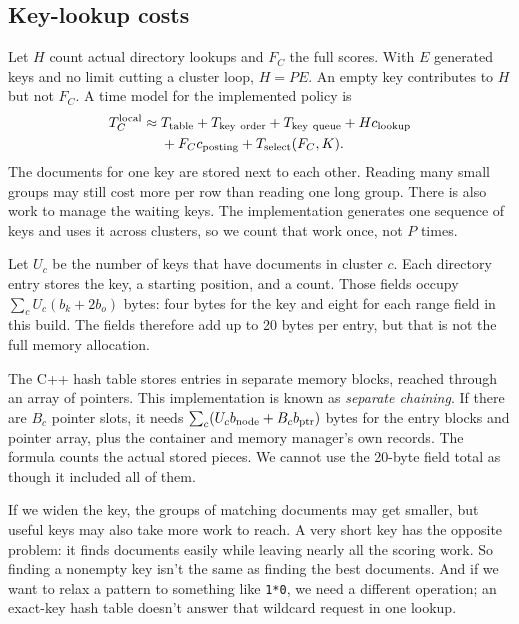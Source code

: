 \subsection{Key-lookup costs}
Let $H$ count actual directory lookups and $F_C$ the full scores. With $E$ generated keys and
no limit cutting a cluster loop, $H=PE$. An empty key contributes to $H$ but not $F_C$. A time
model for the implemented policy is
\begin{equation}
\begin{split}
T_C^{\rm local}\approx{}&T_{\rm table}+T_{\rm key\ order}+T_{\rm key\ queue}
 +Hc_{\rm lookup}\\
 &+F_Cc_{\rm posting}+T_{\rm select}(F_C,K).
\end{split}
\label{eq:key-time}
\end{equation}
The documents for one key are stored next to each other. Reading many small groups may still
cost more per row than reading one long group. There is also work to manage the waiting keys.
The implementation generates one sequence of keys and uses it across clusters, so we count
that work once, not $P$ times.

Let $U_c$ be the number of keys that have documents in cluster $c$. Each directory entry stores
the key, a starting position, and a count. Those fields occupy
$\sum_c U_c(b_k+2b_o)$ bytes: four bytes for the key and eight for each range field in this build.
The fields therefore add up to 20 bytes per entry, but that is not the full memory allocation.

The C++ hash table stores entries in separate memory blocks, reached through an array of
pointers. This implementation is known as \emph{separate chaining}. If there are $B_c$ pointer
slots, it needs $\sum_c(U_cb_{\rm node}+B_cb_{\rm ptr})$ bytes for the entry blocks and pointer
array, plus the container and memory manager's own records. The formula counts the actual
stored pieces. We cannot use the 20-byte field total as though it included all of them.


If we widen the key, the groups of matching documents may get smaller, but useful keys may also take more work
to reach. A very short key has the opposite problem: it finds documents easily while leaving
nearly all the scoring work. So finding a nonempty key isn't the same as finding the best
documents. And if we want to relax a pattern to something like \texttt{1*0}, we need a different
operation; an exact-key hash table doesn't answer that wildcard request in one lookup.